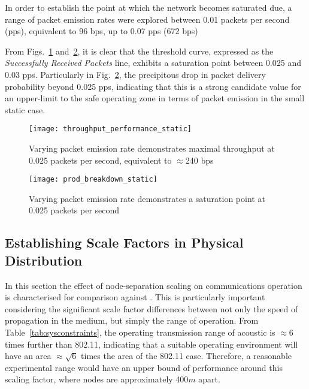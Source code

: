 In order to establish the point at which the network becomes saturated due, a range of packet emission rates were explored between 0.01 packets per second (pps), equivalent to 96 bps, up to 0.07 pps (672 bps)

From Figs.~\ref{fig:throughput_performance_static} and~\ref{fig:prod_breakdown_static}, it is clear that the threshold curve, expressed as the \emph{Successfully Received Packets} line, exhibits a saturation point between 0.025 and 0.03 pps.
Particularly in Fig.~\ref{fig:prod_breakdown_static}, the precipitous drop in packet delivery probability beyond 0.025 pps, indicating that this is a strong candidate value for an upper-limit to the safe operating zone in terms of packet emission in the small static case.

\begin{figure}[H]
	\centering
	\texttt{[image: throughput\_performance\_static]}
	\caption{Varying packet emission rate demonstrates maximal throughput at 0.025 packets per second, equivalent to $\approx$240 bps}
	\label{fig:throughput_performance_static}
\end{figure}


\begin{figure}[H]
	\centering
	\texttt{[image: prod\_breakdown\_static]}
	\caption{Varying packet emission rate demonstrates a saturation point at 0.025 packets per second}
	\label{fig:prod_breakdown_static}
\end{figure}



\subsection{Establishing Scale Factors in Physical Distribution}

In this section the effect of node-separation scaling on communications operation is characterised for comparison against \cite{Guo11}. This is particularly important considering the significant scale factor differences between not only the speed of propagation in the medium, but simply the range of operation. 
From Table~\ref{tab:sysconstraints}, the operating transmission range of acoustic is $\approx 6$ times further than 802.11, indicating that a suitable operating environment will have an area $\approx \sqrt{6}$ times the area of the 802.11 case. Therefore, a reasonable experimental range would have an upper bound of performance around this scaling factor, where nodes are approximately 400$m$ apart. 

